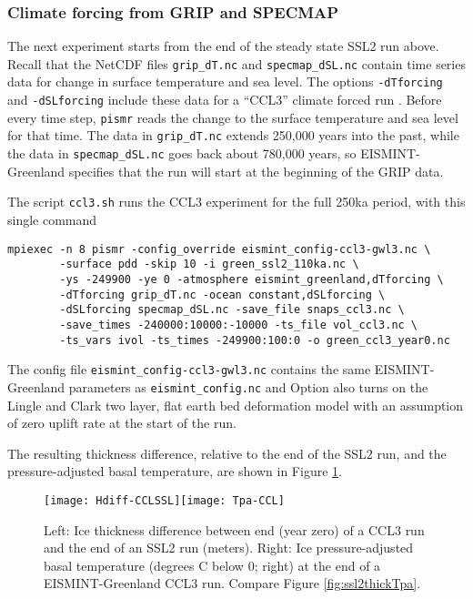 \subsubsection*{Climate forcing from GRIP and SPECMAP} 
\label{sec:climate-forcing}
The next experiment starts from the end of the steady state SSL2 run above.  Recall that the NetCDF files \texttt{grip_dT.nc} and \texttt{specmap_dSL.nc} contain time series data for change in surface temperature and sea level.  The options \texttt{-dTforcing} and \texttt{-dSLforcing} include these data for a ``CCL3'' climate forced run \cite{RitzEISMINT,HuybrechtsEISMINT}.  Before every time step, \texttt{pismr} reads the change to the surface temperature and sea level for that time.  The data in \texttt{grip_dT.nc} extends 250,000 years into the past, while the data in \texttt{specmap_dSL.nc} goes back about 780,000 years, so EISMINT-Greenland specifies that the run will start at the beginning of the GRIP data.  

The script \texttt{ccl3.sh} runs the CCL3 experiment for the full 250ka period, with this single command
\begin{verbatim}
mpiexec -n 8 pismr -config_override eismint_config-ccl3-gwl3.nc \
        -surface pdd -skip 10 -i green_ssl2_110ka.nc \
        -ys -249900 -ye 0 -atmosphere eismint_greenland,dTforcing \
        -dTforcing grip_dT.nc -ocean constant,dSLforcing \
        -dSLforcing specmap_dSL.nc -save_file snaps_ccl3.nc \
        -save_times -240000:10000:-10000 -ts_file vol_ccl3.nc \
        -ts_vars ivol -ts_times -249900:100:0 -o green_ccl3_year0.nc
\end{verbatim}
\noindent The config file \texttt{eismint_config-ccl3-gwl3.nc} contains the same EISMINT-Greenland parameters as \texttt{eismint_config.nc} and Option also turns on the Lingle and Clark \cite{BLKfastearth,LingleClark} two layer, flat earth bed deformation model with an assumption of zero uplift rate at the start of the run.

The resulting thickness difference, relative to the end of the SSL2 run, and the pressure-adjusted basal temperature, are shown in Figure \ref{fig:cclthickTpa}.

\begin{figure}[ht]
\centering
\texttt{[image: Hdiff-CCLSSL]}\quad\texttt{[image: Tpa-CCL]}
\caption{Left:  Ice thickness difference between end (year zero) of a CCL3 run and the end of an SSL2 run (meters).  Right:  Ice pressure-adjusted basal temperature (degrees C below 0; right) at the end of a EISMINT-Greenland CCL3 run.  Compare Figure \ref{fig:ssl2thickTpa}.}
\label{fig:cclthickTpa}
\end{figure}

